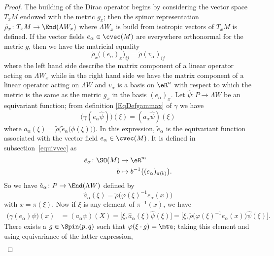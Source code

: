 \begin{proof}
	The building of the Dirac operator begins by considering the vector space $T_xM$ endowed with the metric $g_x$; then the spinor representation $\tilde\rho_x\colon T_xM\to \End(\Lambda W_x)$ where $\Lambda W_x$ is build from isotropic vectors of $T_xM$ is defined. If the vector fields $e_{\alpha}\in\cvec(M)$ are everywhere orthonormal for the metric $g$, then we have the matricial equality
	\begin{equation}		\label{EQooQMKEooWwVyus}
		\tilde\rho_x\big( (e_{\alpha})_x \big)_{ij}=\tilde\rho(v_{\alpha})_{ij}
	\end{equation}
	where the left hand side describe the matrix component of a linear operator acting on $\Lambda W_x$ while in the right hand side we have the matrix component of a linear operator acting on $\Lambda W$ and $v_{\alpha}$ is a basis on $\eR^n$ with respect to which the metric is the same as the metric $g_x$ in the basis $(e_{\alpha})_x$. Let $\hat{\psi}\colon P\to \Lambda W$ be an equivariant function; from definition \eqref{EqDefgammax} of $\gamma$ we have
	\[
		\big( \gamma(e_{\alpha}\hat{\psi}) \big)(\xi)=(a_{\alpha}\hat{\psi})(\xi)
	\]
	where $a_{\alpha}(\xi)=\tilde\rho\Big( \tilde{e}_{\alpha}\big( \phi(\xi) \big) \Big)$. In this expression, $\tilde{e}_{\alpha}$ is the equivariant function associated with the vector field $e_{\alpha}\in\cvec(M)$. It is defined in subsection~\ref{equivvec} as
	\begin{equation}
		\begin{aligned}
			\tilde{e}_{\alpha}\colon \SO(M) & \to \eR^m                                        \\
			b                               & \mapsto b^{-1}\big( (e_{\alpha})_{\pi(b)} \big).
		\end{aligned}
	\end{equation}
	So we have $\hat a_{\alpha}\colon P\to \End(\Lambda W)$ defined by
	\[
		\hat a_{\alpha}(\xi)=\tilde\rho\big( \varphi(\xi)^{-1}e_{\alpha}(x) \big)
	\]
	with $x=\pi(\xi)$. Now if $\xi$ is any element of $\pi^{-1}(x)$, we have
	\begin{align*}
		\big( \gamma(e_{\alpha})\psi \big)(x) & =(a_{\alpha}\psi)(X)=\big[ \xi,\hat a_{\alpha}(\xi)\hat\psi(\xi) \big]
		=\big[ \xi,\tilde\rho\big( \varphi(\xi)^{-1}e_{\alpha}(x) \big)\hat{\psi}(\xi) \big].
	\end{align*}
	There exists a $g\in\Spin(p,q)$ such that $\varphi(\xi\cdot g)=\mtu$; taking this element and using equivariance of the latter expression,
	\begin{align}

\end{align}
\end{proof}

